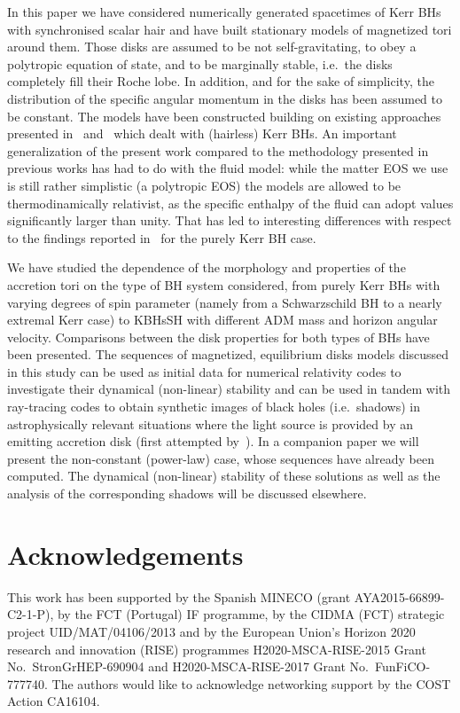 \documentclass[twocolumn,aps,showpacs,showkeys,prd,superscriptaddress,byrevtex, amsmath]{revtex4-1}
\begin{document}
In this paper we have considered numerically generated spacetimes of Kerr BHs with synchronised scalar hair and have built stationary models of magnetized tori around them. Those disks are assumed to be not self-gravitating, to obey a polytropic equation of state, and to be marginally stable, i.e.~the disks completely fill their Roche lobe. In addition, and for the sake of simplicity, the distribution of the specific angular momentum in the disks has been assumed to be constant. The models have been constructed building on existing approaches presented in~\cite{Komissarov:2006} and~\cite{Gimeno-Soler:2017} which dealt with (hairless) Kerr BHs. An important generalization of the present work compared to the methodology presented in previous works has had to do with the fluid model: while the matter EOS we use is still rather simplistic (a polytropic EOS) the models are allowed to be thermodinamically relativist, as the specific enthalpy of the fluid can adopt values significantly larger than unity. That has led to interesting differences with respect to the findings reported in~\cite{Gimeno-Soler:2017} for the purely Kerr BH case.

We have studied the dependence of the morphology and properties of the accretion tori on the type of BH system considered, from purely Kerr BHs with varying degrees of spin parameter (namely from a Schwarzschild BH to a nearly extremal Kerr case)  to KBHsSH with different ADM mass and horizon angular velocity. Comparisons between the disk properties for both types of BHs have been presented. The sequences of magnetized, equilibrium disks models discussed in this study can be used as initial data for numerical relativity codes to investigate their dynamical (non-linear) stability and can be used in tandem with ray-tracing codes to obtain synthetic images of black holes (i.e.~shadows) in astrophysically relevant situations where the light source is provided by an emitting accretion disk (first attempted by~\cite{Vincent:2016}). In a companion paper we will present the non-constant (power-law) case, whose sequences have already been computed. The dynamical (non-linear) stability of these solutions as well as the analysis of the corresponding shadows will be discussed elsewhere.

\section*{Acknowledgements}

This work has been supported by the Spanish MINECO (grant AYA2015-66899-C2-1-P), by the FCT (Portugal) IF programme, by the CIDMA (FCT) strategic project UID/MAT/04106/2013 and by  the  European  Union's  Horizon  2020  research  and  innovation  (RISE) programmes H2020-MSCA-RISE-2015 Grant No.~StronGrHEP-690904 and H2020-MSCA-RISE-2017 Grant No.~FunFiCO-777740. The authors would like to acknowledge networking support by the COST Action CA16104.  
\end{document}
